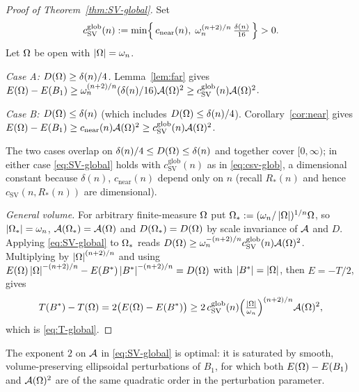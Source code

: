 \begin{proof}[Proof of Theorem~\ref{thm:SV-global}]
Set
\begin{equation}\label{eq:csv-glob}
   c_{\mathrm{SV}}^{\mathrm{glob}}(n)
   :=\min\Bigl\{\,c_{\mathrm{near}}(n),\;
   \omega_n^{(n+2)/n}\,\tfrac{\delta(n)}{16}\,\Bigr\}>0 .
\end{equation}
Let $\Omega$ be open with $\left|\Omega\right|=\omega_n$.

\emph{Case A: $D(\Omega)\ge\delta(n)/4$.} Lemma~\ref{lem:far} gives
$E(\Omega)-E(B_1)\ge\omega_n^{(n+2)/n}(\delta(n)/16)\mathcal A(\Omega)^2
\ge c_{\mathrm{SV}}^{\mathrm{glob}}(n)\mathcal A(\Omega)^2$.

\emph{Case B: $D(\Omega)\le\delta(n)$} (which includes
$D(\Omega)\le\delta(n)/4$). Corollary~\ref{cor:near} gives
$E(\Omega)-E(B_1)\ge c_{\mathrm{near}}(n)\mathcal A(\Omega)^2
\ge c_{\mathrm{SV}}^{\mathrm{glob}}(n)\mathcal A(\Omega)^2$.

The two cases overlap on $\delta(n)/4\le D(\Omega)\le\delta(n)$ and together
cover $[0,\infty)$; in either case \eqref{eq:SV-global} holds with
$c_{\mathrm{SV}}^{\mathrm{glob}}(n)$ as in \eqref{eq:csv-glob}, a
dimensional constant because $\delta(n)$, $c_{\mathrm{near}}(n)$ depend
only on $n$ (recall $R_*(n)$ and hence $c_{\mathrm{SV}}(n,R_*(n))$ are
dimensional).

\emph{General volume.} For arbitrary finite-measure $\Omega$ put
$\Omega_*:=(\omega_n/\left|\Omega\right|)^{1/n}\Omega$, so $\left|\Omega_*\right|=\omega_n$,
$\mathcal A(\Omega_*)=\mathcal A(\Omega)$ and $D(\Omega_*)=D(\Omega)$ by scale invariance of
$\mathcal A$ and $D$. Applying \eqref{eq:SV-global} to $\Omega_*$ reads
$D(\Omega)\ge\omega_n^{-(n+2)/n}c_{\mathrm{SV}}^{\mathrm{glob}}(n)\mathcal A(\Omega)^2$.
Multiplying by $\left|\Omega\right|^{(n+2)/n}$ and using
$E(\Omega)\left|\Omega\right|^{-(n+2)/n}-E(B^*)\left|B^*\right|^{-(n+2)/n}=D(\Omega)$ with
$\left|B^*\right|=\left|\Omega\right|$, then $E=-T/2$, gives
\[
   T(B^*)-T(\Omega)=2\bigl(E(\Omega)-E(B^*)\bigr)
   \ge2\,c_{\mathrm{SV}}^{\mathrm{glob}}(n)
   \Bigl(\tfrac{\left|\Omega\right|}{\omega_n}\Bigr)^{(n+2)/n}\mathcal A(\Omega)^2,
\]
which is \eqref{eq:T-global}.
\end{proof}

\begin{remark}
The exponent $2$ on $\mathcal A$ in \eqref{eq:SV-global} is optimal: it is
saturated by smooth, volume-preserving ellipsoidal perturbations of
$B_1$, for which both $E(\Omega)-E(B_1)$ and $\mathcal A(\Omega)^2$ are of the same
quadratic order in the perturbation parameter.
\end{remark}


